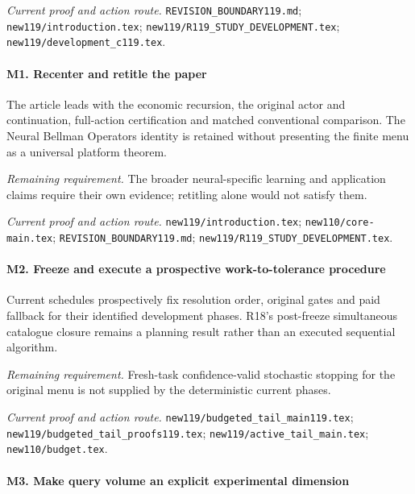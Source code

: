 \par\emph{Current proof and action route.} \nolinkurl{REVISION_BOUNDARY119.md}; \nolinkurl{new119/introduction.tex}; \nolinkurl{new119/R119_STUDY_DEVELOPMENT.tex}; \nolinkurl{new119/development_c119.tex}.

\paragraph{M1. Recenter and retitle the paper}

The article leads with the economic recursion, the original actor and continuation, full-action certification and matched conventional comparison. The Neural Bellman Operators identity is retained without presenting the finite menu as a universal platform theorem.

\par\emph{Remaining requirement.} The broader neural-specific learning and application claims require their own evidence; retitling alone would not satisfy them.

\par\emph{Current proof and action route.} \nolinkurl{new119/introduction.tex}; \nolinkurl{new110/core-main.tex}; \nolinkurl{REVISION_BOUNDARY119.md}; \nolinkurl{new119/R119_STUDY_DEVELOPMENT.tex}.

\paragraph{M2. Freeze and execute a prospective work-to-tolerance procedure}

Current schedules prospectively fix resolution order, original gates and paid fallback for their identified development phases. R18's post-freeze simultaneous catalogue closure remains a planning result rather than an executed sequential algorithm.

\par\emph{Remaining requirement.} Fresh-task confidence-valid stochastic stopping for the original menu is not supplied by the deterministic current phases.

\par\emph{Current proof and action route.} \nolinkurl{new119/budgeted_tail_main119.tex}; \nolinkurl{new119/budgeted_tail_proofs119.tex}; \nolinkurl{new119/active_tail_main.tex}; \nolinkurl{new110/budget.tex}.

\paragraph{M3. Make query volume an explicit experimental dimension}

